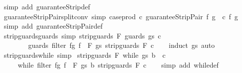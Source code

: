 \begin{isabellebody}
%
\isatagproof
{}\isamarkupfalse%
\ {\isacharparenleft}simp\ add{\isacharcolon}\ guaranteeStrip{\isacharunderscore}def{\isacharparenright}%
\endisatagproof
{\isafoldproof}%
%
\isadelimproof
\isanewline
%
\endisadelimproof
\isanewline
{}\isamarkupfalse%
\ guaranteeStripPair{\isacharunderscore}split{\isacharunderscore}conv\ {\isacharbrackleft}simp{\isacharbrackright}{\isacharcolon}\ {\isachardoublequoteopen}case{\isacharunderscore}prod\ c\ {\isacharparenleft}guaranteeStripPair\ f\ g{\isacharparenright}\ {\isacharequal}\ c\ f\ g{\isachardoublequoteclose}\isanewline
%
\isadelimproof
\ \ %
\endisadelimproof
%
\isatagproof
{}\isamarkupfalse%
\ {\isacharparenleft}simp\ add{\isacharcolon}\ guaranteeStripPair{\isacharunderscore}def{\isacharparenright}%
\endisatagproof
{\isafoldproof}%
%
\isadelimproof
\isanewline
%
\endisadelimproof
\isanewline
{}\isamarkupfalse%
\ strip{\isacharunderscore}guards{\isacharunderscore}guards\ {\isacharbrackleft}simp{\isacharbrackright}{\isacharcolon}\ {\isachardoublequoteopen}strip{\isacharunderscore}guards\ F\ {\isacharparenleft}guards\ gs\ c{\isacharparenright}\ {\isacharequal}\isanewline
\ \ \ \ \ \ \ \ guards\ {\isacharparenleft}filter\ {\isacharparenleft}{\isasymlambda}{\isacharparenleft}f{\isacharcomma}g{\isacharparenright}{\isachardot}\ f\ {\isasymnotin}\ F{\isacharparenright}\ gs{\isacharparenright}\ {\isacharparenleft}strip{\isacharunderscore}guards\ F\ c{\isacharparenright}{\isachardoublequoteclose}\isanewline
%
\isadelimproof
\ \ %
\endisadelimproof
%
\isatagproof
{}\isamarkupfalse%
\ {\isacharparenleft}induct\ gs{\isacharparenright}\ auto%
\endisatagproof
{\isafoldproof}%
%
\isadelimproof
\isanewline
%
\endisadelimproof
\isanewline
{}\isamarkupfalse%
\ strip{\isacharunderscore}guards{\isacharunderscore}while\ {\isacharbrackleft}simp{\isacharbrackright}{\isacharcolon}\isanewline
\ {\isachardoublequoteopen}strip{\isacharunderscore}guards\ F\ {\isacharparenleft}while\ gs\ b\ \ c{\isacharparenright}\ {\isacharequal}\ \isanewline
\ \ \ \ \ while\ {\isacharparenleft}filter\ {\isacharparenleft}{\isasymlambda}{\isacharparenleft}f{\isacharcomma}g{\isacharparenright}{\isachardot}\ f\ {\isasymnotin}\ F{\isacharparenright}\ gs{\isacharparenright}\ b\ {\isacharparenleft}strip{\isacharunderscore}guards\ F\ c{\isacharparenright}{\isachardoublequoteclose}\isanewline
%
\isadelimproof
\ \ %
\endisadelimproof
%
\isatagproof
{}\isamarkupfalse%
\ {\isacharparenleft}simp\ add{\isacharcolon}\ while{\isacharunderscore}def{\isacharparenright}%
\endisatagproof

\end{isabellebody}

